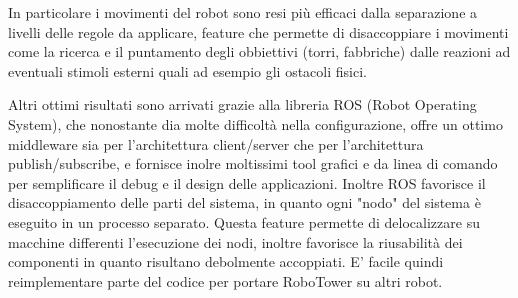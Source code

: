 In particolare i movimenti del robot sono resi più efficaci dalla separazione a livelli delle regole da applicare, feature che permette di disaccoppiare i movimenti come la ricerca e il puntamento degli obbiettivi (torri, fabbriche) dalle reazioni ad eventuali stimoli esterni quali ad esempio gli ostacoli fisici.

Altri ottimi risultati sono arrivati grazie alla libreria ROS (Robot Operating System), che nonostante dia molte difficoltà nella configurazione, offre un ottimo middleware sia per l'architettura client/server che per l'architettura publish/subscribe, e fornisce inolre moltissimi tool grafici e da linea di comando per semplificare il debug e il design delle applicazioni. Inoltre ROS favorisce il disaccoppiamento delle parti del sistema, in quanto ogni "nodo" del sistema è eseguito in un processo separato. Questa feature permette di delocalizzare su macchine differenti l'esecuzione dei nodi, inoltre favorisce la riusabilità dei componenti in quanto risultano debolmente accoppiati. E' facile quindi reimplementare parte del codice per portare RoboTower su altri robot.